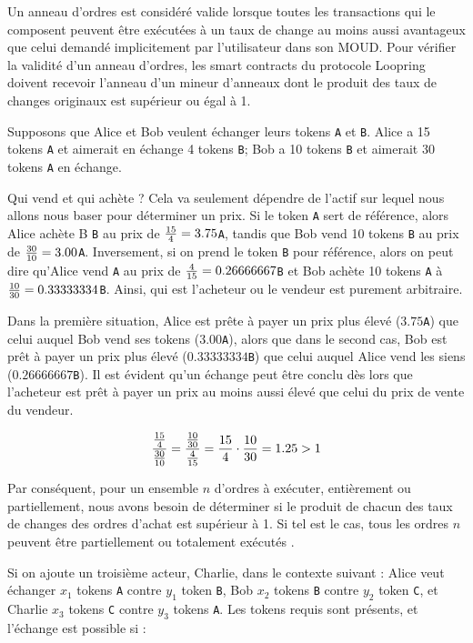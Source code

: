 \documentclass[UTF8,nofonts]{article}
\begin{document}
\begin{multicols}{2}
Un anneau d'ordres est considéré valide lorsque toutes les transactions qui le composent peuvent être exécutées à un taux de change au moins aussi avantageux que celui demandé implicitement par l'utilisateur dans son MOUD. Pour vérifier la validité d'un anneau d'ordres, les smart contracts du protocole Loopring doivent recevoir l'anneau d'un mineur d'anneaux dont le produit des taux de changes originaux est supérieur ou égal à 1.

Supposons que Alice et Bob veulent échanger leurs tokens \verb|A| et \verb|B|. Alice a 15 tokens \verb|A| et aimerait en échange 4 tokens \verb|B|; Bob a 10 tokens \verb|B| et aimerait 30 tokens \verb|A| en échange.

Qui vend et qui achète ? Cela va seulement dépendre de l'actif sur lequel nous allons nous baser pour déterminer un prix. Si le token \verb|A| sert de référence, alors Alice achète B \verb|B| au prix de ${15 \over 4} = 3.75$\verb|A|, tandis que Bob vend 10 tokens \verb|B| au prix de  ${30 \over 10} = 3.00$\verb|A|. Inversement, si on prend le token \verb|B| pour référence, alors on peut dire qu'Alice vend \verb|A| au prix de ${4\over 15}=0.26666667$\verb|B| et Bob achète 10 tokens \verb|A| à ${10 \over 30}=0.33333334$\verb|B|. Ainsi, qui est l'acheteur ou le vendeur est purement arbitraire.

Dans la première situation, Alice est prête à payer un prix plus élevé ($3.75$\verb|A|) que celui auquel Bob vend ses tokens ($3.00$\verb|A|), alors que dans le second cas, Bob est prêt à payer un prix plus élevé ($0.33333334$\verb|B|) que celui auquel Alice vend les siens ($0.26666667$\verb|B|). Il est évident qu'un échange peut être conclu dès lors que l'acheteur est prêt à payer un prix au moins aussi élevé que celui du prix de vente du vendeur.

\begin{equation}
{{15\over 4} \over {30\over 10}} = {{10\over 30} \over {4\over 15}}={15 \over 4} \cdot {10 \over 30} = 1.25 > 1
\end{equation}

Par conséquent, pour un ensemble $n$ d'ordres à exécuter, entièrement ou partiellement, nous avons besoin de déterminer si le produit de chacun des taux de changes des ordres d'achat est supérieur à 1. Si tel est le cas, tous les ordres $n$ peuvent être partiellement ou totalement exécutés \cite{supersymmetry}.

Si on ajoute un troisième acteur, Charlie, dans le contexte suivant : Alice veut échanger $x_1$ tokens \verb|A| contre $y_1$ token \verb|B|, Bob $x_2$ tokens \verb|B| contre $y_2$ token \verb|C|, et Charlie $x_3$ tokens \verb|C| contre $y_3$ tokens \verb|A|. Les tokens requis sont présents, et l'échange est possible si :


\end{multicols}
\end{document}
